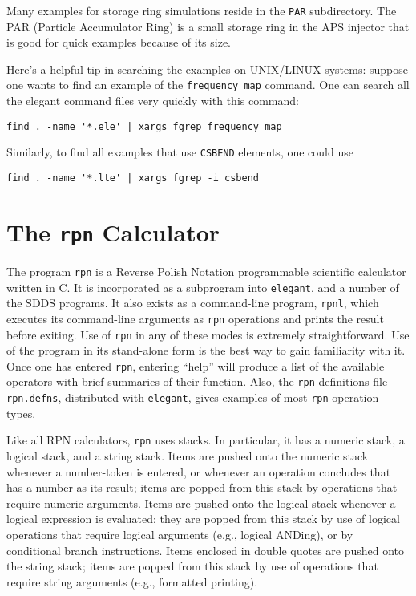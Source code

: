 \documentclass[11pt]{article}
\begin{document}
Many examples for storage ring simulations reside in the {\tt PAR} subdirectory.
The PAR (Particle Accumulator Ring) is a small storage ring in the APS injector
that is good for quick examples because of its size.

Here's a helpful tip in searching the examples on UNIX/LINUX systems: suppose one wants
to find an example of the \verb|frequency_map| command.  One can search all the elegant
command files very quickly with this command:
\begin{verbatim}
find . -name '*.ele' | xargs fgrep frequency_map
\end{verbatim}
Similarly, to find all examples that use \verb|CSBEND| elements, one could use
\begin{verbatim}
find . -name '*.lte' | xargs fgrep -i csbend
\end{verbatim}


\newpage
\section{The {\tt rpn} Calculator}

The program {\tt rpn} is a Reverse Polish Notation programmable
scientific calculator written in C.  It is incorporated as a
subprogram into {\tt elegant}, and a number of the SDDS programs.  It
also exists as a command-line program, {\tt rpnl}, which executes its
command-line arguments as {\tt rpn} operations and prints the result
before exiting.  Use of {\tt rpn} in any of these modes is extremely
straightforward.  Use of the program in its stand-alone form is the
best way to gain familiarity with it.  Once one has entered {\tt rpn},
entering ``help'' will produce a list of the available operators with
brief summaries of their function.  Also, the {\tt rpn} definitions
file \verb|rpn.defns|, distributed with {\tt elegant}, gives examples
of most {\tt rpn} operation types.

Like all RPN calculators, {\tt rpn} uses stacks.  In particular, it
has a numeric stack, a logical stack, and a string stack.  Items are
pushed onto the numeric stack whenever a number-token is entered, or
whenever an operation concludes that has a number as its result; items
are popped from this stack by operations that require numeric
arguments.  Items are pushed onto the logical stack whenever a logical
expression is evaluated; they are popped from this stack by use of
logical operations that require logical arguments (e.g., logical
ANDing), or by conditional branch instructions.  Items enclosed in
double quotes are pushed onto the string stack; items are popped from
this stack by use of operations that require string arguments (e.g.,
formatted printing).
\end{document}
